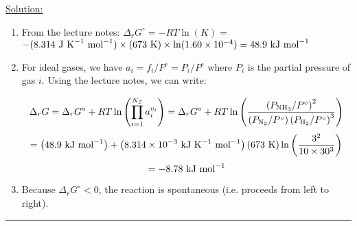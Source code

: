 \noindent
\underline{Solution:}

\begin{enumerate}
\item From the lecture notes: $\Delta_rG^\circ = -RT\ln(K) =$ $-(8.314\textnormal{ J K}^{-1}\textnormal{ mol}^{-1})\times (673\textnormal{ K})\times\ln(1.60\times 10^{-4}) = 48.9\textnormal{ kJ mol}^{-1}$
\item For ideal gases, we have $a_i = f_i / P^\circ = P_i / P^\circ$ where $P_i$ is the partial pressure of gas $i$. Using the lecture notes, we can write:

$$\Delta_rG = \Delta_rG^\circ + RT\ln\left(\prod\limits_{i=1}^{N_S}a_i^{v_i}\right) = \Delta_r G^\circ + RT\ln\left(\frac{\left(P_{\textnormal{NH}_3} / P^\circ\right)^2}{\left(P_{\textnormal{N}_2}/P^\circ\right)\left(P_{\textnormal{H}_2}/P^\circ\right)^3}\right)$$
$$= \left(48.9\textnormal{ kJ mol}^{-1}\right) + \left(8.314\times 10^{-3}\textnormal{ kJ K}^{-1}\textnormal{ mol}^{-1}\right)\left(673\textnormal{ K}\right)\ln\left(\frac{3^2}{10\times 30^3}\right)$$
$$ = -8.78\textnormal{ kJ mol}^{-1}$$

\item Because $\Delta_r G^\circ < 0$, the reaction is spontaneous (i.e. proceeds from left to right).
\end{enumerate}
\hrule\vspace{0.5cm}
